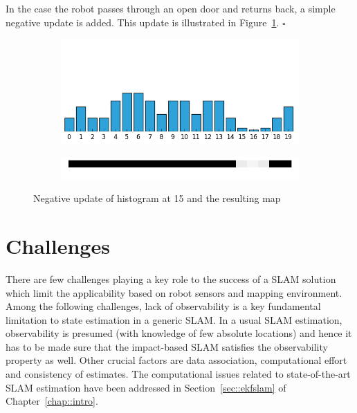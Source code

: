 \begin{exmp}
In the case the robot passes through an open door and returns back, a simple negative update is added. This update is illustrated in Figure~\ref{ex24_coll15}. \hfill $\square$
\begin{figure}
\centering
\begin{subfigure}{\textwidth}
\centering
\includegraphics[scale=0.4]{./images/ex24/ex24coll15.png}
\end{subfigure}
\begin{subfigure}{\textwidth}
\centering
\includegraphics[scale=0.4]{./images/ex24/ex24wall15.png}
\end{subfigure}
\caption[Update of negative information in histogram]{Negative update of histogram at 15 and the resulting map}
\label{ex24_coll15}
\end{figure}
\label{ex24}
\end{exmp}   

\section{Challenges} \label{sec::challenges}
There are few challenges playing a key role to the success of a SLAM solution which limit the applicability based on robot sensors and mapping environment. Among the following challenges, lack of observability is a key fundamental limitation to state estimation in a generic SLAM. In a usual SLAM estimation, observability is presumed (with knowledge of few absolute locations) and hence it has to be made sure that the impact-based SLAM satisfies the observability property as well. Other crucial factors are data association, computational effort and consistency of estimates. The computational issues related to state-of-the-art SLAM estimation have been addressed in Section~\ref{sec::ekfslam} of Chapter~\ref{chap::intro}. 

